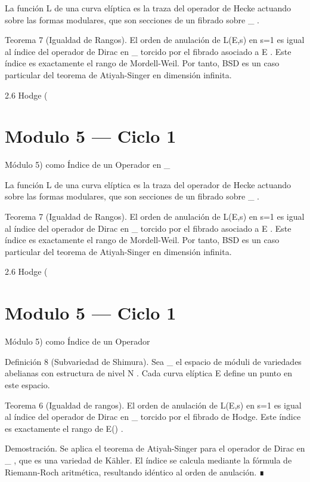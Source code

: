 \documentclass[12pt,twoside]{book}
\begin{document}
La función  L  de una curva elíptica es la traza del operador de Hecke actuando sobre las formas modulares, que son secciones de un fibrado sobre  _{} .

Teorema 7 (Igualdad de Rangos). El orden de anulación de  L(E,s)  en  s=1  es igual al índice del operador de Dirac en  _{}  torcido por el fibrado asociado a  E . Este índice es exactamente el rango de Mordell-Weil. Por tanto, BSD es un caso particular del teorema de Atiyah-Singer en dimensión infinita.

2.6 Hodge (

\chapter{Modulo 5 — Ciclo 1}
Módulo 5) como Índice de un Operador en  _{} 

La función  L  de una curva elíptica es la traza del operador de Hecke actuando sobre las formas modulares, que son secciones de un fibrado sobre  _{} .

Teorema 7 (Igualdad de Rangos). El orden de anulación de  L(E,s)  en  s=1  es igual al índice del operador de Dirac en  _{}  torcido por el fibrado asociado a  E . Este índice es exactamente el rango de Mordell-Weil. Por tanto, BSD es un caso particular del teorema de Atiyah-Singer en dimensión infinita.

2.6 Hodge (

\chapter{Modulo 5 — Ciclo 1}
Módulo 5) como Índice de un Operador

Definición 8 (Subvariedad de Shimura). Sea  _{} \subset {}  el espacio de móduli de variedades abelianas con estructura de nivel  N . Cada curva elíptica  E  define un punto en este espacio.

Teorema 6 (Igualdad de rangos). El orden de anulación de  L(E,s)  en  s=1  es igual al índice del operador de Dirac en  _{}  torcido por el fibrado de Hodge. Este índice es exactamente el rango de  E() .

Demostración. Se aplica el teorema de Atiyah-Singer para el operador de Dirac en  _{} , que es una variedad de Kähler. El índice se calcula mediante la fórmula de Riemann-Roch aritmética, resultando idéntico al orden de anulación. ∎
\end{document}

